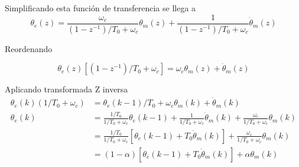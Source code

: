\documentclass[11pt]{article} %
\begin{document}
Simplificando esta función de transferencia se llega a
\[ \theta_e(z) = \frac{\omega_c}{(1-z^{-1})/T_0 + \omega_c} \theta_m (z) + \frac{1}{(1-z^{-1})/T_0 + \omega_c} \dot{\theta}_m(z) \]

Reordenando

\[ \theta_e(z)\left[ (1-z^{-1})/T_0 + \omega_c \right] = 
\omega_c \theta_m(z) + \dot{\theta}_m(z) \]

Aplicando transformada Z inversa
\begin{align*}
\theta_e(k)(1/T_0 + \omega_c) &= \theta_e(k-1)/T_0 + \omega_c \theta_m(k) + \dot{\theta}_m(k) \\
\theta_e(k) &= \frac{1/T_0}{1/T_0 + \omega_c} \theta_e(k-1) 
				+ \frac{1}{1/T_0 + \omega_c} \dot{\theta}_m(k) 
				+ \frac{\omega_c}{1/T_0 + \omega_c} \theta_m(k) \\
				&= \frac{1/T_0}{1/T_0 + \omega_c}[\theta_e(k-1) 
				+ T_0 \dot{\theta}_m(k) ]
				+ \frac{\omega_c}{1/T_0 + \omega_c} \theta_m(k)  \\
				&= (1-\alpha)[\theta_e(k-1) + T_0 \dot{\theta}_m(k) ] + \alpha \theta_m(k)
\end{align*}
\end{document}
